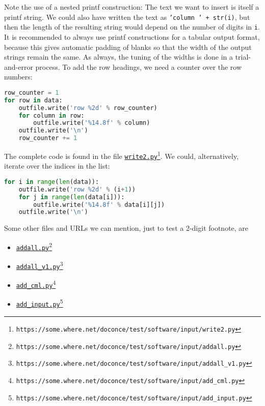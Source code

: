 \documentclass[graybox,sectrefs,envcountresetchap,open=right,final]{svmonodo}
\begin{document}
Note the use of a nested printf construction: The text we want to
insert is itself a printf string. We could also have written the
text as \texttt{'column  ' + str(i)}, but then the length of the
resulting string would depend on the number of digits in \texttt{i}.
It is recommended to always use printf constructions for
a tabular output format, because this gives automatic padding of
blanks so that the width of the output strings remain the same.
As always, the tuning of the widths is done in a trial-and-error
process.
To add the row headings, we need a counter over the row numbers:
\begin{lstlisting}[language=Python,style=simple,xleftmargin=2mm]
row_counter = 1
for row in data:
    outfile.write('row %2d' % row_counter)
    for column in row:
        outfile.write('%14.8f' % column)
    outfile.write('\n')
    row_counter += 1

\end{lstlisting}

The complete code is found in the file \href{{https://some.where.net/doconce/test/software/input/write2.py}}{\nolinkurl{write2.py}\footnote{\texttt{https://some.where.net/doconce/test/software/input/write2.py}}}.
We could, alternatively, iterate over the indices in the list:
\begin{lstlisting}[language=Python,style=simple,xleftmargin=2mm]
for i in range(len(data)):
    outfile.write('row %2d' % (i+1))
    for j in range(len(data[i])):
        outfile.write('%14.8f' % data[i][j])
    outfile.write('\n')

\end{lstlisting}

Some other files and URLs we can mention, just to test a 2-digit footnote,
are
\begin{itemize}
 \item \href{{https://some.where.net/doconce/test/software/input/addall.py}}{\nolinkurl{addall.py}\footnote{\texttt{https://some.where.net/doconce/test/software/input/addall.py}}}
 \item \href{{https://some.where.net/doconce/test/software/input/addall_v1.py}}{\nolinkurl{addall_v1.py}\footnote{\texttt{https://some.where.net/doconce/test/software/input/addall\_v1.py}}}
 \item \href{{https://some.where.net/doconce/test/software/input/add_cml.py}}{\nolinkurl{add_cml.py}\footnote{\texttt{https://some.where.net/doconce/test/software/input/add\_cml.py}}}
 \item \href{{https://some.where.net/doconce/test/software/input/add_input.py}}{\nolinkurl{add_input.py}\footnote{\texttt{https://some.where.net/doconce/test/software/input/add\_input.py}}}
\end{itemize}
\noindent
\end{document}
